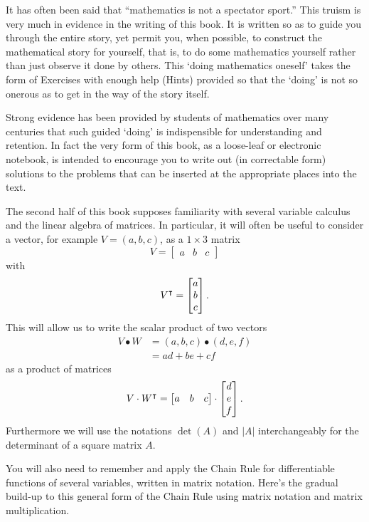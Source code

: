 \documentclass[handout]{ximera}
\begin{document}
It has often been said that ``mathematics is not a spectator sport.''
This truism is very much in evidence in the writing of this book. It
is written so as to guide you through the entire story, yet permit
you, when possible, to construct the mathematical story for yourself,
that is, to do some mathematics yourself rather than just observe it
done by others. This `doing mathematics oneself' takes the form of
Exercises with enough help (Hints) provided so that the `doing' is not
so onerous as to get in the way of the story itself.

Strong evidence has been provided by students of mathematics over many
centuries that such guided `doing' is indispensible for understanding and
retention. In fact the very form of this book, as a loose-leaf or electronic
notebook, is intended to encourage you to write out (in correctable form)
solutions to the problems that can be inserted at the appropriate places into
the text.

The second half of this book supposes familiarity with several
variable calculus and the linear algebra of matrices. In particular,
it will often be useful to consider a vector, for example
$V=\left(a,b,c\right)$, as a $1\times3$ matrix
\[
V=
\begin{bmatrix}
a & b & c
\end{bmatrix}
\]
with
\[
V^\intercal  =
\begin{bmatrix}
a\\
b\\
c
\end{bmatrix}.
\]
This will allow us to write the scalar product of two vectors%
\begin{align*}
V\bullet W  &  =\left(  a,b,c\right)  \bullet\left(d,e,f\right) \\
&  =ad+be+cf%
\end{align*}
as a product of matrices%
\[
V\cdot W^\intercal=
\begin{bmatrix}
a & b & c
\end{bmatrix} 
\cdot
\begin{bmatrix}
d\\
e\\
f
\end{bmatrix}.
\]
Furthermore we will use the notations $\det(A)$ and $|A|$
interchangeably for the determinant of a square matrix $A$.

You will also need to remember and apply the Chain Rule for differentiable
functions of several variables, written in matrix notation. Here's the
gradual build-up to this general form of the Chain Rule using matrix
notation and matrix multiplication.
\end{document}
